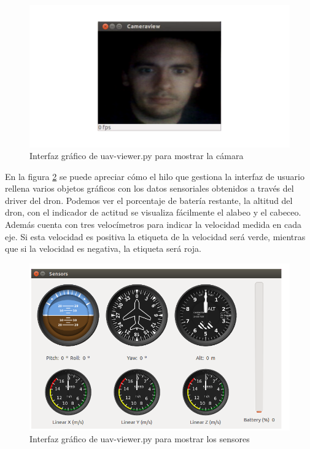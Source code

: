 \begin{figure}[H]
  \centering
  \includegraphics[scale=0.4]{imagenes/cameraView.png}
  \caption{Interfaz gráfico de uav-viewer.py para mostrar la cámara}
  \label{fig:cameraView}
\end{figure}

En la figura \ref{fig:sensores} se puede apreciar cómo el hilo que gestiona la interfaz de usuario rellena varios objetos gráficos con los datos sensoriales obtenidos a través del driver del dron. Podemos ver el porcentaje de batería restante, la altitud del dron, con el indicador de actitud se visualiza fácilmente el alabeo y el cabeceo. Además cuenta con tres velocímetros para indicar la velocidad medida en cada eje. Si esta velocidad es positiva la etiqueta de la velocidad será verde, mientras que si la velocidad es negativa, la etiqueta será roja.

\begin{figure}[H]
  \centering
  \includegraphics[scale=0.4]{imagenes/sensores.png}
  \caption{Interfaz gráfico de uav-viewer.py para mostrar los sensores}
  \label{fig:sensores}
\end{figure}

